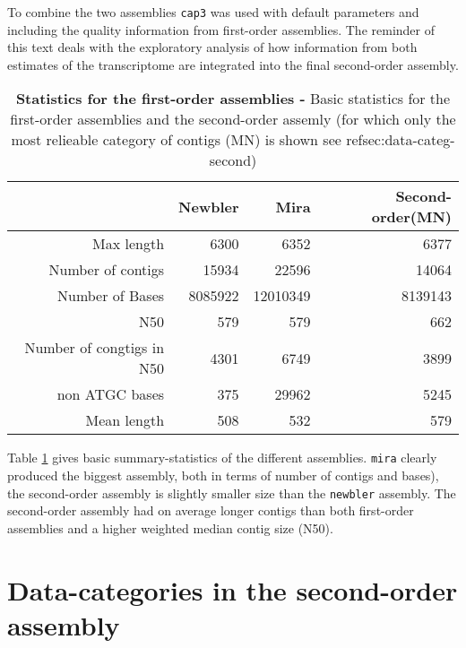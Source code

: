 To combine the two assemblies \texttt{cap3} was used with default
parameters and including the quality information from first-order
assemblies. The reminder of this text deals with the exploratory
analysis of how information from both estimates of the transcriptome
are integrated into the final second-order assembly. 

\begin{table}[ht]
\begin{center}
\begin{tabular}{rrrr}
  \hline
 & Newbler & Mira & Second-order(MN) \\ 
  \hline
Max length & 6300 & 6352 & 6377 \\ 
  Number of contigs & 15934 & 22596 & 14064 \\ 
  Number of Bases & 8085922 & 12010349 & 8139143 \\ 
  N50 & 579 & 579 & 662 \\ 
  Number of congtigs in N50 & 4301 & 6749 & 3899 \\ 
  non ATGC bases & 375 & 29962 & 5245 \\ 
  Mean length & 508 & 532 & 579 \\ 
   \hline
\end{tabular}
\caption[Statistics for the first-order assemblies]{\textbf{Statistics
    for the first-order assemblies -} Basic statistics for the
  first-order assemblies and the second-order assemly (for which only
  the most relieable category of contigs (MN) is shown see
  ref{sec:data-categ-second})}
\label{tab:pc}
\end{center}
\end{table}
Table \ref{tab:pc} gives basic summary-statistics of the different
assemblies. \texttt{mira} clearly produced the biggest assembly, both
in terms of number of contigs and bases), the second-order assembly is
slightly smaller size than the \texttt{newbler} assembly.  The
second-order assembly had on average longer contigs than both
first-order assemblies and a higher weighted median contig size (N50).


\section{Data-categories in the second-order assembly}
\label{sec:data-categ-second}

